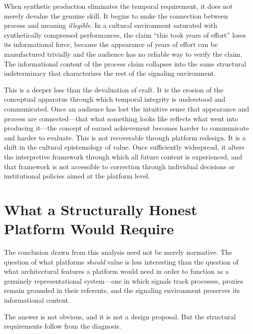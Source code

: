 \documentclass[12pt, a4paper]{article}
\begin{document}
When synthetic production eliminates the temporal requirement, it does not merely devalue the genuine skill. It begins to make the connection between process and meaning \textit{illegible}. In a cultural environment saturated with synthetically compressed performances, the claim ``this took years of effort'' loses its informational force, because the appearance of years of effort can be manufactured trivially and the audience has no reliable way to verify the claim. The informational content of the process claim collapses into the same structural indeterminacy that characterizes the rest of the signaling environment.

This is a deeper loss than the devaluation of craft. It is the erosion of the conceptual apparatus through which temporal integrity is understood and communicated. Once an audience has lost the intuitive sense that appearance and process are connected---that what something looks like reflects what went into producing it---the concept of earned achievement becomes harder to communicate and harder to evaluate. This is not recoverable through platform redesign. It is a shift in the cultural epistemology of value. Once sufficiently widespread, it alters the interpretive framework through which all future content is experienced, and that framework is not accessible to correction through individual decisions or institutional policies aimed at the platform level.

\section{What a Structurally Honest Platform Would Require}

The conclusion drawn from this analysis need not be merely normative. The question of what platforms \textit{should} value is less interesting than the question of what architectural features a platform would need in order to function as a genuinely representational system---one in which signals track processes, proxies remain grounded in their referents, and the signaling environment preserves its informational content.

The answer is not obvious, and it is not a design proposal. But the structural requirements follow from the diagnosis.
\end{document}

